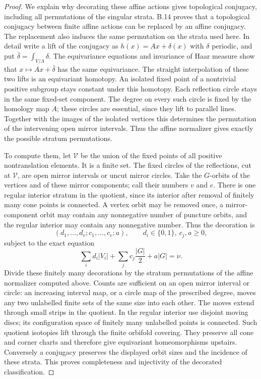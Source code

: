 \begin{proof}
We explain why decorating these affine actions gives topological
conjugacy, including all permutations of the singular strata.
B.14 proves that a topological conjugacy between finite affine actions
can be replaced by an affine conjugacy.  The replacement also induces
the same permutation on the strata used here.  In detail write a lift
of the conjugacy as $h(x)=Ax+\delta(x)$ with $\delta$ periodic, and
put $\bar\delta=\int_{V/\Lambda}\delta$.  The equivariance equations
and invariance of Haar measure show that $x\mapsto Ax+\bar\delta$
has the same equivariance.  The straight interpolation of these two
lifts is an equivariant homotopy.  An isolated fixed point of a
nontrivial positive subgroup stays constant under this homotopy.
Each reflection circle stays in the same fixed-set component.
The degree on every such circle is fixed by the homology map $A$;
these circles are essential, since they lift to parallel lines.
Together with the images of the isolated vertices this determines
the permutation of the intervening open mirror intervals.  Thus the
affine normalizer gives exactly the possible stratum permutations.

To compute them, let $\mathcal V$ be the union of the fixed points of
all positive nontranslation elements.  It is a finite set.  The fixed
circles of the reflections, cut at $\mathcal V$, are open mirror
intervals or uncut mirror circles.  Take the $G$-orbits of the vertices
and of these mirror components; call their numbers $v$ and $e$.
There is one regular interior stratum in the quotient, since its
interior after removal of finitely many cone points is connected.
A vertex orbit may be removed once, a mirror-component orbit may
contain any nonnegative number of puncture orbits, and the regular
interior may contain any nonnegative number.  Thus the decoration is
\[
 (d_1,\ldots,d_v;c_1,\ldots,c_e;a),\qquad
 d_i\in\{0,1\},\ c_j,a\ge0,
\]
subject to the exact equation
\[
      \sum_i d_i|V_i|+\sum_j c_j\frac{|G|}{2}+a|G|=\nu.
                                                        \tag{B.27.5}
\]
Divide these finitely many decorations by the stratum permutations
of the affine normalizer computed above.  Counts are sufficient on
an open mirror interval or circle: an increasing interval map, or a
circle map of the prescribed degree, moves any two unlabelled finite
sets of the same size into each other.  The moves extend through
small strips in the quotient.  In the regular interior use disjoint
moving discs; its configuration space of finitely many unlabelled
points is connected.  Such quotient isotopies lift through the finite
orbifold covering.  They preserve all cone and corner charts and
therefore give equivariant homeomorphisms upstairs.  Conversely a
conjugacy preserves the displayed orbit sizes and the incidence of
these strata.  This proves completeness and injectivity of the
decorated classification.


\end{proof}
